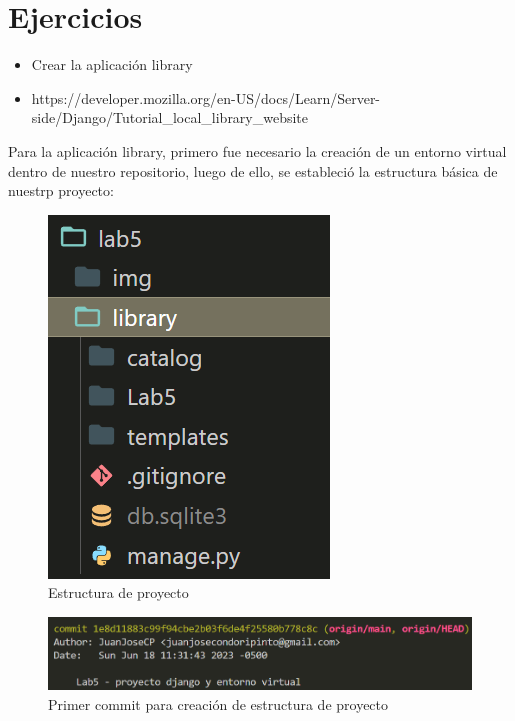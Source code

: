 \documentclass{article}
\begin{document}
    \section{Ejercicios}
    \begin{itemize}
        \item Crear la aplicación library
        \item https://developer.mozilla.org/en-US/docs/Learn/Server-side/Django/Tutorial\_local\_library\_website
        
    \end{itemize}

    Para la aplicación library, primero fue necesario la creación de un entorno virtual dentro de nuestro repositorio, luego de ello, se estableció la estructura básica de nuestrp proyecto:

    \begin{figure}[H]
        \centering
        \includegraphics[scale=0.5]{img/img0.png}
        \caption{Estructura de proyecto}
        \label{fig:imagen}
    \end{figure}
    
    \begin{figure}[H]
        \centering
        \includegraphics[scale=0.5]{img/img0_commit.png}
        \caption{Primer commit para creación de estructura de proyecto}
        \label{fig:imagen}
    \end{figure}
\end{document}
